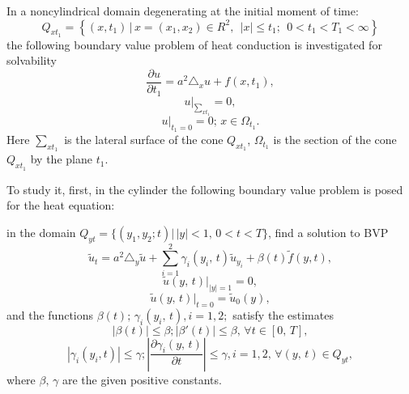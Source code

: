 
\vzmscaption

In a noncylindrical domain degenerating at the initial moment of time:
$$
Q_{xt_{1}}\!=\!\left\{(x,t_{1})\,\Big|\, x=(x_{1}, x_{2})\in R^{2},\; \,|x|\leq t_{1}; \; \,
0< t_{1}<T_{1}<\infty \right\}
$$
the following boundary value problem of heat conduction is investigated for solvability
\begin{equation}\label{32-1}
\frac{\partial u}{\partial t_1}=a^{2}\triangle_x u+f(x,t_{1}),
\end{equation}
\begin{equation}\label{33-1}
u|_{\sum_{xt_{1}}}=0,
\end{equation}
\begin{equation}\label{34-1}
u|_{t_{1}=0}=0;\, x\in\Omega_{t_{1}}.
\end{equation}
Here $\sum_{xt_{1}}$ is the lateral surface of the cone $Q_{xt_{1}}$,
$\Omega_{t_{1}}$ is the section of the cone $Q_{xt_{1}}$ by the plane  $t_{1}$.

To study it, first, in the cylinder the following boundary value problem is posed for the heat equation:

in the domain $Q_{yt}=\{(y_{1}, y_{2}; t) | \, |y|<1, \, 0<t<T \}$,  find a solution to BVP
\begin{equation}\label{7}
\tilde{u}_{t}=a^{2}\triangle_{y}\tilde{u}+\sum_{i=1}^{2}\gamma_{i}(y_{i},\,t)\tilde{u}_{y_{i}}+\beta(t)\tilde{f}(y,t),
\end{equation}
\begin{equation}\label{5}
\tilde{u}(y,\,t)|_{|y|=1}=0,
\end{equation}
\begin{equation}\label{6}
\tilde{u}(y,\,t)|_{t=0}=\tilde{u}_{0}(y),
\end{equation}
and the functions $\beta(t);\,\gamma_{i}(y_{i},\,t),i=1,2;$
satisfy the estimates
\begin{equation}\label{6-1}
|\beta(t)|\leq \beta; |\beta'(t)|\leq\beta, \, {\forall t\in[0,\,T]},
\end{equation}
\begin{equation}\label{6-2}
|\gamma_{i}(y_{i}, t)|\leq\gamma; \left|\frac{\partial \gamma_{i}(y,\,t)}{\partial t}\right|\leq\gamma, i=1,2,\, \forall(y,\,t)\in Q_{yt},
\end{equation}
where $\beta,\, \gamma$ are the given positive constants.

